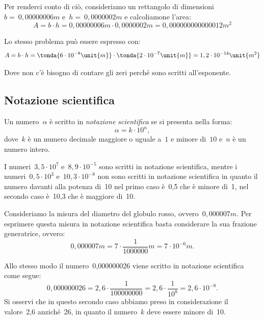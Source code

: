 Per renderci conto di ciò, consideriamo un rettangolo di dimensioni
\(b =~0,00000006\unit{m}\) e~\(h =~0,0000002\unit{m}\) e calcoliamone l'area:
\[A=b\cdot h=0,00000006\unit{m}\cdot0,0000002\unit{m}=
0,000000000000012\unit{m^2}\]

\begin{center}

\end{center}

Lo stesso problema può essere espresso con:
\[A=b\cdot h=\tonda{6 \cdot 10^{-8}\unit{m}} \cdot
\tonda{2 \cdot 10^{-7}\unit{m}}=
1,2\cdot 10^{-14}\unit{m^2}\]

Dove non c'è bisogno di contare gli zeri perché sono scritti all'esponente.

\subsection{Notazione scientifica}
\begin{definizione}
Un numero~\(\alpha\) è scritto in \emph{notazione scientifica} se
si presenta nella forma:
\[\alpha=k\cdot10^n,\]
dove~\(k\) è un numero decimale maggiore o uguale a~\(1\) e minore di~\(10\)
e~\(n\) è un numero intero.
\end{definizione}

 \begin{esempio}
I numeri~\(3,5\cdot10^7\) e~\(8,9\cdot10^{-5}\) sono scritti in notazione
scientifica, mentre i numeri~\(0,5\cdot10^3\) e~\(10,3\cdot 10^{-8}\) non
sono scritti in notazione scientifica in quanto il numero davanti alla
potenza di~10 nel primo caso è~0,5 che è minore di~1, nel secondo caso è~10,3
che è maggiore di~10.
 \end{esempio}

Consideriamo la misura del diametro del globulo rosso,
ovvero~\(0,000007\unit{m}\).
Per esprimere questa misura in notazione scientifica basta considerare la
sua
frazione generatrice, ovvero:
\[0,000007\unit{m}=7\cdot\frac{1}{1000000}\unit{m}=7\cdot10^{-6}\unit{m}.\]

Allo stesso modo il numero~0,000000026 viene scritto in notazione
scientifica
come segue:
\[0,000000026=2,6\cdot\frac{1}{100000000}=2,6\cdot\frac{1}{10^8}=2,6\cdot10^
{-8}.\]
Si osservi che in questo secondo caso abbiamo preso in considerazione il
valore~2,6 anziché~26, in quanto il numero~\(k\) deve essere minore di~10.

